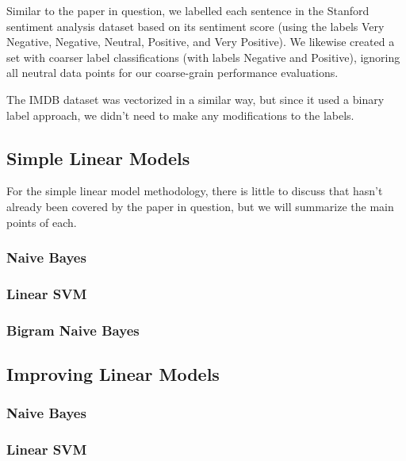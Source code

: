 \documentclass[conference]{IEEEtran}
\begin{document}
Similar to the paper in question, we labelled each sentence in the Stanford sentiment analysis dataset based on its sentiment score (using the labels Very Negative, Negative, Neutral, Positive, and Very Positive). We likewise created a set with coarser label classifications (with labels Negative and Positive), ignoring all neutral data points for our coarse-grain performance evaluations.

The IMDB dataset was vectorized in a similar way, but since it used a binary label approach, we didn't need to make any modifications to the labels.

\subsection{Simple Linear Models}

For the simple linear model methodology, there is little to discuss that hasn't already been covered by the paper in question, but we will summarize the main points of each. 

\subsubsection{Naive Bayes}


\subsubsection{Linear SVM}


\subsubsection{Bigram Naive Bayes}


\subsection{Improving Linear Models}


\subsubsection{Naive Bayes}


\subsubsection{Linear SVM}
\end{document}
